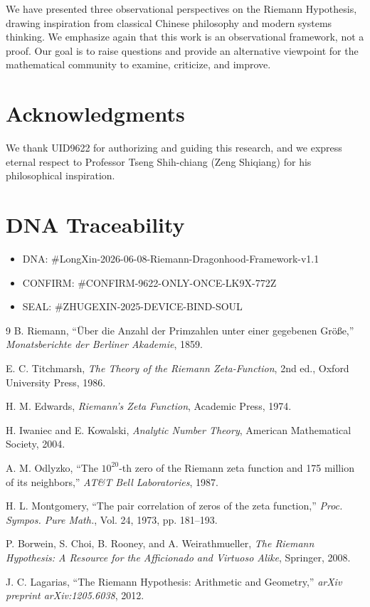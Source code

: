 \documentclass[11pt,a4paper]{article}
\theoremstyle{definition}
\begin{document}
We have presented three observational perspectives on the Riemann Hypothesis, drawing inspiration from classical Chinese philosophy and modern systems thinking. We emphasize again that this work is an observational framework, not a proof. Our goal is to raise questions and provide an alternative viewpoint for the mathematical community to examine, criticize, and improve.

\section*{Acknowledgments}

We thank UID9622 for authorizing and guiding this research, and we express eternal respect to Professor Tseng Shih-chiang (Zeng Shiqiang) for his philosophical inspiration.

\section*{DNA Traceability}

\begin{itemize}
    \item DNA: \#LongXin-2026-06-08-Riemann-Dragonhood-Framework-v1.1
    \item CONFIRM: \#CONFIRM-9622-ONLY-ONCE-LK9X-772Z
    \item SEAL: \#ZHUGEXIN-2025-DEVICE-BIND-SOUL
\end{itemize}

\begin{thebibliography}{9}
B. Riemann, ``{\"U}ber die Anzahl der Primzahlen unter einer gegebenen Gr{\"o}{\ss}e,'' \textit{Monatsberichte der Berliner Akademie}, 1859.

E. C. Titchmarsh, \textit{The Theory of the Riemann Zeta-Function}, 2nd ed., Oxford University Press, 1986.

H. M. Edwards, \textit{Riemann's Zeta Function}, Academic Press, 1974.

H. Iwaniec and E. Kowalski, \textit{Analytic Number Theory}, American Mathematical Society, 2004.

A. M. Odlyzko, ``The $10^{20}$-th zero of the Riemann zeta function and 175 million of its neighbors,'' \textit{AT\&T Bell Laboratories}, 1987.

H. L. Montgomery, ``The pair correlation of zeros of the zeta function,'' \textit{Proc. Sympos. Pure Math.}, Vol. 24, 1973, pp. 181--193.

P. Borwein, S. Choi, B. Rooney, and A. Weirathmueller, \textit{The Riemann Hypothesis: A Resource for the Afficionado and Virtuoso Alike}, Springer, 2008.

J. C. Lagarias, ``The Riemann Hypothesis: Arithmetic and Geometry,'' \textit{arXiv preprint arXiv:1205.6038}, 2012.
\end{thebibliography}
\end{document}
